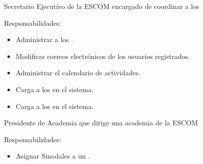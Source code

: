 \begin{actor}{Secretario Ejecutivo}{ de la ESCOM encargado de coordinar a los } 
	\item[Responsabilidades:] \hspace{1pt}
	\begin{itemize}
		\item Administrar a los .
		\item Modificar correos electrónicos de los usuarios registrados.
		\item Administrar el calendario de actividades.
		\item Carga a los  en el sistema.
		\item Carga a los  en el sistema.
	\end{itemize}
\end{actor}


\begin{actor}{Presidente de Academia}{ que dirige una academia de la ESCOM} 
	\item[Responsabilidades:] \hspace{1pt}
	\begin{itemize}
		\item  Asignar Sinodales a un .
	\end{itemize}
\end{actor}


